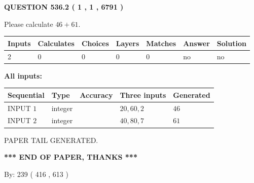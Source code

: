 \documentclass[12pt]{article}
\begin{document}
   
  
\vspace{0.2in}
  
{\textbf{\Large{QUESTION
536.2 
 ( 1 , 1 , 6791 )
}}}
  
  
 
Please calculate $ %
46 +  %
61 $.
 
 
   
   
   
   
\noindent\begin{tabular}{|l|l|l|l|l|l|l|}
 \hline
Inputs & Calculates & Choices & Layers & Matches & Answer & Solution \\ \hline
 2  & 
 0  & 
 0
  & 
 0  & 
 0  & 
  no & 
  no 
  \\ \hline
 \end{tabular}
   
   
   
   
\noindent{}
   
   
   
   
\noindent\vspace{0.1in}\hspace{-0.08in} {\textbf{\Large{All inputs: }}}
   
   
  
  
\noindent\begin{tabular}{|l|l|l|l|l|}
\hline
 Sequential & Type & Accuracy & Three inputs & Generated \\ 
\hline
 
 
  INPUT $  1 $ & integer &  & $
 20
 , 
 60
 , 
 2
 $ & $ 46 $ 
 \\  \hline  
 
 
  INPUT $  2 $ & integer &  & $
 40
 , 
 80
 , 
 7
 $ & $ 61 $ 
 \\  \hline  
 \end{tabular}
   
   
   
   
   
   
 \vspace{0.2in}
 
   
   
\vspace{2.0in} PAPER TAIL GENERATED.
   
   
   
   
\vspace{1.0in} 
{\textbf{\large{ *** END OF PAPER, THANKS *** }}} 
   
   
\hspace{1.0in} By: 
 239 ( 416 ,  613 )
   
\end{document}
